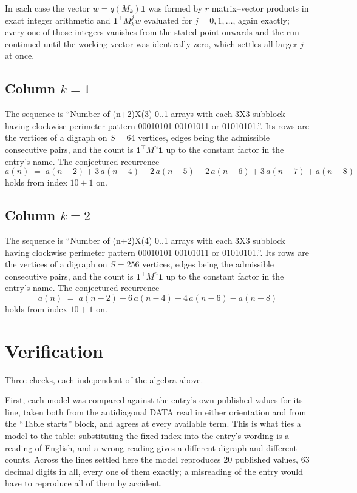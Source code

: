 \documentclass[11pt,a4paper]{article}
\theoremstyle{plain}
\theoremstyle{definition}
\begin{document}
In each case the vector $w=q(M_k)\mathbf{1}$ was formed by $r$ matrix--vector products in
exact integer arithmetic and $\mathbf{1}^{\!\top}M_k^{j}w$ evaluated for $j=0,1,\dots$,
again exactly; every one of those integers vanishes from the stated point onwards and the run
continued until the working vector was identically zero, which settles all larger $j$ at once.

\subsection*{Column $k$$=1$}
The sequence is ``Number of (n+2)X(3) 0..1 arrays with each 3X3 subblock having clockwise perimeter pattern 00010101 00101011 or 01010101.''. Its rows are the vertices of a digraph on
$S=64$ vertices, edges being the admissible consecutive pairs, and the count is
$\mathbf{1}^{\!\top}M^{n}\mathbf{1}$ up to the constant factor in the entry's name.
The conjectured recurrence
\[
a(n)\;=\;a(n-2) + 3\,a(n-4) + 2\,a(n-5) + 2\,a(n-6) + 3\,a(n-7) + a(n-8)
\]
holds from index $10+1$ on.

\subsection*{Column $k$$=2$}
The sequence is ``Number of (n+2)X(4) 0..1 arrays with each 3X3 subblock having clockwise perimeter pattern 00010101 00101011 or 01010101.''. Its rows are the vertices of a digraph on
$S=256$ vertices, edges being the admissible consecutive pairs, and the count is
$\mathbf{1}^{\!\top}M^{n}\mathbf{1}$ up to the constant factor in the entry's name.
The conjectured recurrence
\[
a(n)\;=\;a(n-2) + 6\,a(n-4) + 4\,a(n-6) - a(n-8)
\]
holds from index $10+1$ on.

\section{Verification}

Three checks, each independent of the algebra above.

First, each model was compared against the entry's own published values for its line, taken
both from the antidiagonal DATA read in either orientation and from the ``Table starts''
block, and agrees at every available term. This is what ties a model to the table:
substituting the fixed index into the entry's wording is a reading of English, and a wrong
reading gives a different digraph and different counts. Across the lines settled here the
model reproduces $20$ published values, $63$ decimal digits in all, every one of
them exactly; a misreading of the entry would have to reproduce all of them by accident.
\end{document}
